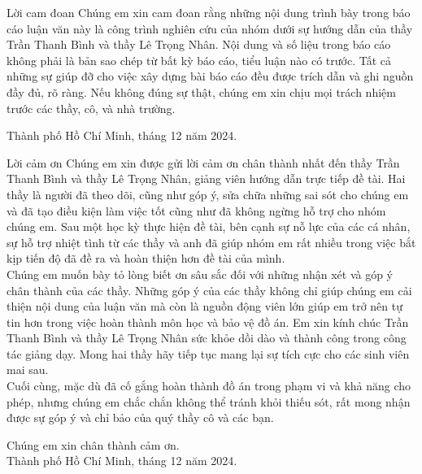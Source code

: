 \begin{preface}{Lời cam đoan}
\tab Chúng em xin cam đoan rằng những nội dung trình bày trong báo cáo luận văn này là công trình nghiên cứu của nhóm dưới sự hướng dẫn của thầy Trần Thanh Bình và thầy Lê Trọng Nhân. Nội dung và số liệu trong báo cáo không phải là bản sao chép từ bất kỳ báo cáo, tiểu luận nào có trước. Tất cả những sự giúp đỡ cho việc xây dựng bài báo cáo đều được trích dẫn và ghi nguồn đầy đủ, rõ ràng. Nếu không đúng sự thật, chúng em xin chịu mọi trách nhiệm trước các thầy, cô, và nhà trường.
\begin{flushright}
Thành phố Hồ Chí Minh, tháng 12 năm 2024.
\end{flushright}
\end{preface}
\newpage
\begin{preface}{Lời cảm ơn}
\tab Chúng em xin được gửi lời cảm ơn chân thành nhất đến thầy Trần Thanh Bình và thầy Lê Trọng Nhân, giảng viên hướng dẫn trực tiếp đề tài. Hai thầy là người đã theo dõi, cũng như góp ý, sửa chữa những sai sót cho chúng em và đã tạo điều kiện làm việc tốt cũng như đã không ngừng hỗ trợ cho nhóm chúng em. Sau một học kỳ thực hiện đề tài, bên cạnh sự nỗ lực của các cá nhân, sự hỗ trợ nhiệt tình từ các thầy và anh đã giúp nhóm em rất nhiều trong việc bắt kịp tiến độ đã đề ra và hoàn thiện hơn đề tài của mình.\\
\tab Chúng em muốn bày tỏ lòng biết ơn sâu sắc đối với những nhận xét và góp ý chân thành của các thầy. Những góp ý của các thầy không chỉ giúp chúng em cải thiện nội dung của luận văn mà còn là nguồn động viên lớn giúp em trở nên tự tin hơn trong việc hoàn thành môn học và bảo vệ đồ án.
Em xin kính chúc Trần Thanh Bình và thầy Lê Trọng Nhân sức khỏe dồi dào và thành công trong công tác giảng dạy. Mong hai thầy hãy tiếp tục mang lại sự tích cực cho các sinh viên mai sau.\\
\tab Cuối cùng, mặc dù đã cố gắng hoàn thành đồ án trong phạm vi và khả năng cho phép, nhưng chúng em chắc chắn không thể tránh khỏi thiếu sót, rất mong nhận được sự góp ý và chỉ bảo của quý thầy cô và các bạn.\\
\begin{flushright}
Chúng em xin chân thành cảm ơn.\\
Thành phố Hồ Chí Minh, tháng 12 năm 2024.\\
\end{flushright}
\end{preface}
\newpage
